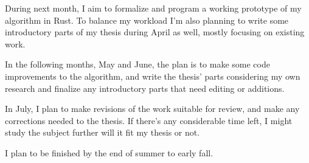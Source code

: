 \documentclass[a4paper,12pt]{article}
\begin{document}
During next month, I aim to formalize and program a working prototype of my algorithm in Rust. To balance my workload I'm also planning to write some introductory parts of my thesis during April as well, mostly focusing on existing work.

In the following months, May and June, the plan is to make some code improvements to the algorithm, and write the thesis' parts considering my own research and finalize any introductory parts that need editing or additions.

In July, I plan to make revisions of the work suitable for review, and make any corrections needed to the thesis. If there's any considerable time left, I might study the subject further will it fit my thesis or not.

I plan to be finished by the end of summer to early fall.



\end{document}
